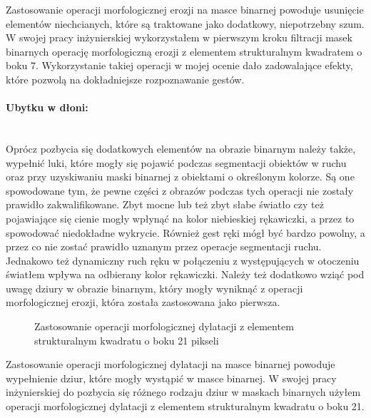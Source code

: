 \documentclass[a4paper,12pt,twoside,openany]{report}
\newcommand{\ImgPath}{.}
\begin{document}
Zastosowanie operacji morfologicznej erozji na masce binarnej powoduje usunięcie elementów niechcianych, które są traktowane jako dodatkowy, niepotrzebny szum. W swojej pracy inżynierskiej wykorzystałem w pierwszym kroku filtracji masek binarnych operację morfologiczną erozji z elementem strukturalnym kwadratem o boku 7. Wykorzystanie takiej operacji w mojej ocenie dało zadowalające efekty, które pozwolą na dokładniejsze rozpoznawanie gestów.

\paragraph{Ubytku w dłoni:} \mbox{} \\ \indent
Oprócz pozbycia się dodatkowych elementów na obrazie binarnym należy także, wypełnić luki, które mogły się pojawić podczas segmentacji obiektów w ruchu oraz przy uzyskiwaniu maski binarnej z obiektami o określonym kolorze. Są one spowodowane tym, że pewne części z obrazów podczas tych operacji nie zostały prawidło zakwalifikowane. Zbyt mocne lub też zbyt słabe światło czy też pojawiające się cienie mogły wpłynąć na kolor niebieskiej rękawiczki, a przez to spowodować niedokładne wykrycie. Również gest ręki mógł być bardzo powolny, a przez co nie zostać prawidło uznanym  przez operacje segmentacji ruchu. Jednakowo też dynamiczny ruch ręku w połączeniu z występujących w otoczeniu światłem wpływa na odbierany kolor rękawiczki. Należy też dodatkowo wziąć pod uwagę dziury w obrazie binarnym, który mogły wyniknąć z operacji morfologicznej erozji, która została zastosowana jako pierwsza. 

\begin{figure}[H]
	\centering
	\caption{Zastosowanie operacji morfologicznej dylatacji z elementem strukturalnym kwadratu o boku 21 pikseli}
\end{figure}

Zastosowanie operacji morfologicznej dylatacji na masce binarnej powoduje wypełnienie dziur, które mogły wystąpić w masce binarnej. W swojej pracy inżynierskiej do pozbycia się różnego rodzaju dziur w maskach binarnych użyłem operacji morfologicznej dylatacji z elementem strukturalnym kwadratu o boku 21. 
\end{document}
